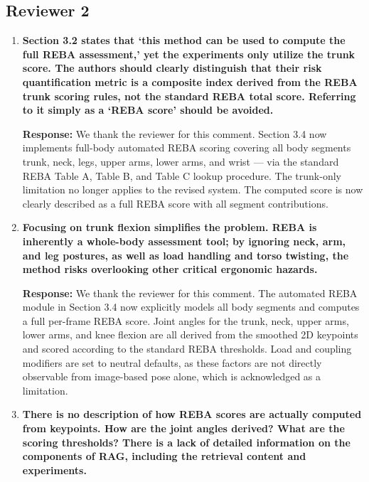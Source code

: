 \subsection*{Reviewer 2}

\begin{enumerate}
    \item \textbf{Section 3.2 states that `this method can be used to compute the full REBA assessment,' yet the experiments only utilize the trunk score. The authors should clearly distinguish that their risk quantification metric is a composite index derived from the REBA trunk scoring rules, not the standard REBA total score. Referring to it simply as a `REBA score' should be avoided.}

    \textbf{Response:} We thank the reviewer for this comment. Section 3.4 now implements full-body automated REBA scoring covering all body segments trunk, neck, legs, upper arms, lower arms, and wrist --- via the standard REBA Table A, Table B, and Table C lookup procedure. The trunk-only limitation no longer applies to the revised system. The computed score is now clearly described as a full REBA score with all segment contributions.

    \item \textbf{Focusing on trunk flexion simplifies the problem. REBA is inherently a whole-body assessment tool; by ignoring neck, arm, and leg postures, as well as load handling and torso twisting, the method risks overlooking other critical ergonomic hazards.}

    \textbf{Response:} We thank the reviewer for this comment. The automated REBA module in Section 3.4 now explicitly models all body segments and computes a full per-frame REBA score. Joint angles for the trunk, neck, upper arms, lower arms, and knee flexion are all derived from the smoothed 2D keypoints and scored according to the standard REBA thresholds. Load and coupling modifiers are set to neutral defaults, as these factors are not directly observable from image-based pose alone, which is acknowledged as a limitation.

    \item \textbf{There is no description of how REBA scores are actually computed from keypoints. How are the joint angles derived? What are the scoring thresholds? There is a lack of detailed information on the components of RAG, including the retrieval content and experiments.}


\end{enumerate}

